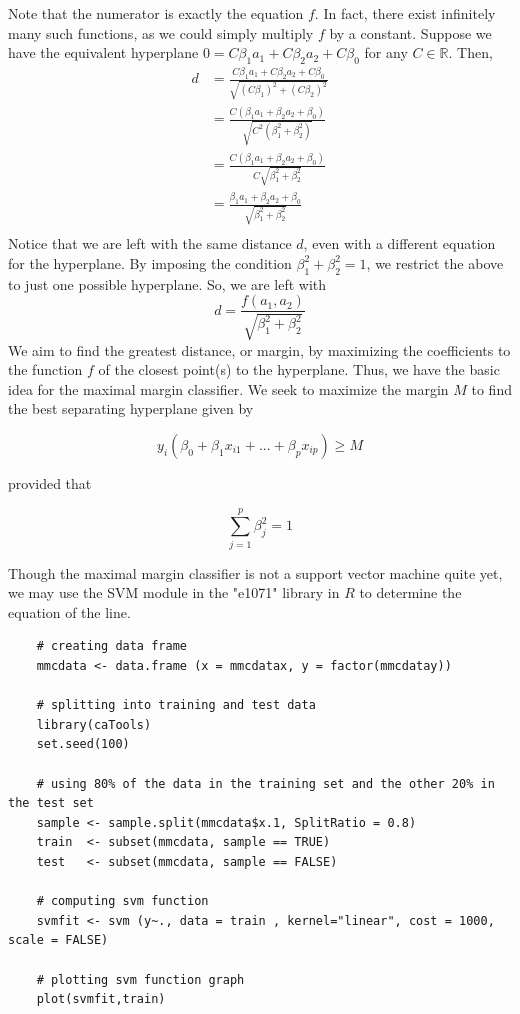 \documentclass[12pt]{article}
\begin{document}
Note that the numerator is exactly the equation $f$. In fact, there exist infinitely many such functions, as we could simply multiply $f$ by a constant. Suppose we have the equivalent hyperplane $ 0=C\beta_1a_1+C\beta_2a_2+C\beta_0$ for any $C \in \mathbb{R}$. Then,
\begin{align*}
    d&= \frac{C\beta_1a_1+C\beta_2a_2+C\beta_0}{\sqrt{(C\beta_1)^2+(C\beta_2)^2}} \\
    &=\frac{C(\beta_1a_1+\beta_2a_2+\beta_0)}{\sqrt{C^2(\beta_1^2+\beta_2^2)}} \\
    &=\frac{C(\beta_1a_1+\beta_2a_2+\beta_0)}{C\sqrt{\beta_1^2+\beta_2^2}} \\
    &=\frac{\beta_1a_1+\beta_2a_2+\beta_0}{\sqrt{\beta_1^2+\beta_2^2}} \\
\end{align*}
Notice that we are left with the same distance $d$, even with a different equation for the hyperplane. By imposing the condition $\beta_1^2+\beta_2^2=1$, we restrict the above to just one possible hyperplane. So, we are left with $$d=\frac{f(a_1,a_2)}{\sqrt{\beta_1^2+\beta_2^2}}$$ We aim to find the greatest distance, or margin, by maximizing the coefficients to the function $f$ of the closest point(s) to the hyperplane. Thus, we have the basic idea for the maximal margin classifier. We seek to maximize the margin $M$ to find the best separating hyperplane given by

$$y_i(\beta_0+\beta_1x_{i1}+...+\beta_px_{ip}) \ge M$$

provided that

\begin{equation}\label{sumofsquares}
\sum_{j=1}^{p} \beta^2_j=1
\end{equation}

Though the maximal margin classifier is not a support vector machine quite yet, we may use the SVM module in the "e1071" library in $R$ to determine the equation of the line.

\begin{verbatim}
    # creating data frame 
    mmcdata <- data.frame (x = mmcdatax, y = factor(mmcdatay))
    
    # splitting into training and test data
    library(caTools)
    set.seed(100)
    
    # using 80% of the data in the training set and the other 20% in the test set
    sample <- sample.split(mmcdata$x.1, SplitRatio = 0.8)
    train  <- subset(mmcdata, sample == TRUE)
    test   <- subset(mmcdata, sample == FALSE)
    
    # computing svm function
    svmfit <- svm (y~., data = train , kernel="linear", cost = 1000, scale = FALSE)
    
    # plotting svm function graph
    plot(svmfit,train)
\end{verbatim}
\end{document}
